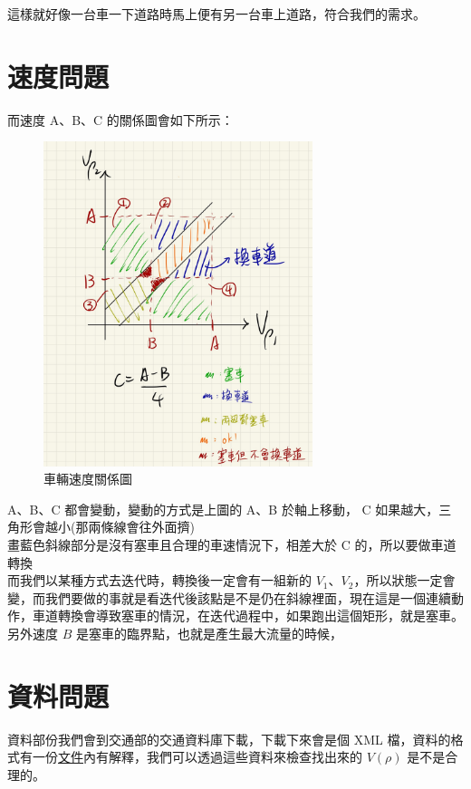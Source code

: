 \documentclass[a4paper,12pt]{report}
\begin{document}
\begin{CJK*}{UTF8}{bkai}
這樣就好像一台車一下道路時馬上便有另一台車上道路，符合我們的需求。 \newpage

\section{速度問題}

而速度 A、B、C 的關係圖會如下所示：

\begin{figure}[H] 
\centering 
\includegraphics[width=0.7\textwidth]{11-1} 
\caption{車輛速度關係圖} 
\label{Fig.main2} 
\end{figure}

A、B、C 都會變動，變動的方式是上圖的 A、B 於軸上移動， C 如果越大，三角形會越小(那兩條線會往外面擠)\\

畫藍色斜線部分是沒有塞車且合理的車速情況下，相差大於 C 的，所以要做車道轉換\\

而我們以某種方式去迭代時，轉換後一定會有一組新的 $V_1$、$V_2$，所以狀態一定會變，而我們要做的事就是看迭代後該點是不是仍在斜線裡面，現在這是一個連續動作，車道轉換會導致塞車的情況，在迭代過程中，如果跑出這個矩形，就是塞車。另外速度 $B$ 是塞車的臨界點，也就是產生最大流量的時候，

\section{資料問題}

資料部份我們會到交通部的交通資料庫下載，下載下來會是個 XML 檔，資料的格式有一份\href{https://www.motc.gov.tw/uploaddowndoc?file=bussiness/201810051359110.pdf&filedisplay=%E9%99%84%E4%BB%B62-%E4%BA%A4%E9%80%9A%E9%83%A8%E5%8D%B3%E6%99%82%E8%B7%AF%E6%B3%81%E8%B3%87%E6%96%99%E6%A8%99%E6%BA%96v2-XML%E6%A8%99%E6%BA%96%E6%A0%BC%E5%BC%8F%E6%96%87%E4%BB%B6-20180802.pdf&flag=doc}{文件}內有解釋，我們可以透過這些資料來檢查找出來的 $V(\rho)$ 是不是合理的。


\end{CJK*}
\end{document}
